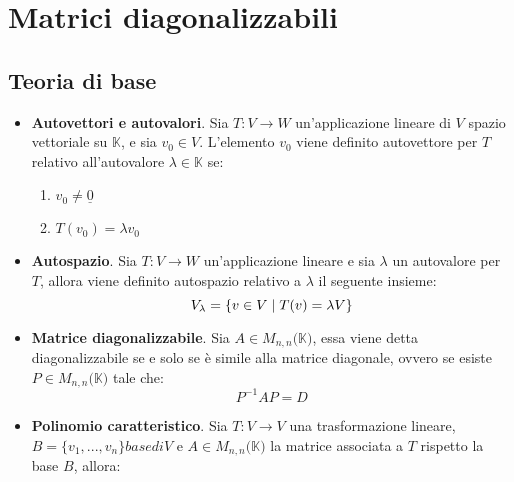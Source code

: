 \documentclass[12pt,a4paper,oneside]{book}
\begin{document}


\newpage
				\chapter{Matrici diagonalizzabili}


			   		  \section{Teoria di base}

\begin{itemize}

\item \textbf{Autovettori e autovalori}. \linebreak
	  Sia $T:V\rightarrow W$ un'applicazione lineare di $V$ spazio vettoriale su $\mathbb{K}$, e sia 
	  $v_0\in V$. L'elemento $v_0$ viene definito autovettore per $T$ relativo all'autovalore $\lambda \in 
	  \mathbb{K} $ se:
	  
	  \begin{enumerate}
	  \item $v_0 \neq \underline{0}$
	  \item $T(v_0) = \lambda v_0$
	  \end{enumerate}
	
\item \textbf{Autospazio}. \linebreak
	  Sia $T:V\rightarrow W$ un'applicazione lineare e sia $\lambda$ un autovalore per $T$, allora viene 
	  definito autospazio relativo a $\lambda$ il seguente insieme:
	  $$V_{\lambda}=\{v\in V \hspace{0.1cm}|\hspace{0.1cm} T(v) = \lambda V\}$$
	
\item \textbf{Matrice diagonalizzabile}. \linebreak
	  Sia $A\in M_{n,n}(\mathbb{K)}$, essa viene detta diagonalizzabile se e solo se è simile alla matrice
	  diagonale, ovvero se esiste $P\in M_{n,n}(\mathbb{K)}$ tale che:
	  $$P^{-1}AP = D$$
	
\item \textbf{Polinomio caratteristico}. \linebreak
	  Sia $T:V\rightarrow V$ una trasformazione lineare, $B=\{v_1, ..., v_n\} base di V$ e $A\in M_{n,n}
	  (\mathbb{K)}$ la matrice associata a $T$ rispetto la base $B$, allora:
	  

\end{itemize}
\end{document}
